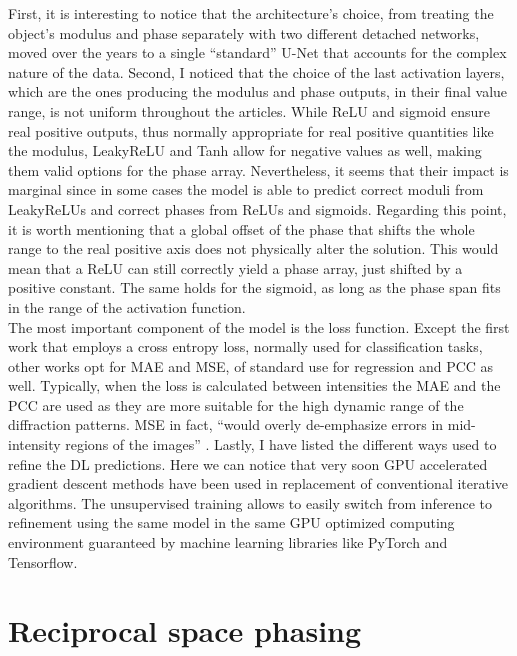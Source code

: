 First, it is interesting to notice that the architecture's choice, from treating the object's modulus and phase separately 
with two different detached networks, moved over the years to a single ``standard'' U-Net that accounts for the complex 
nature of the data. Second, I noticed that the choice of the last activation layers, which are the ones producing the 
modulus and phase outputs, in their final value range, is not uniform throughout the articles. While ReLU and sigmoid
ensure real positive outputs, thus normally appropriate for real positive quantities like the modulus, LeakyReLU and Tanh  
allow for negative values as well, making them valid options for the phase array. Nevertheless, it seems that their impact is marginal 
since in some cases the model is able to predict correct moduli from LeakyReLUs and correct phases from ReLUs and sigmoids. 
Regarding this point, it is worth mentioning that a global offset of the phase that shifts the whole range to the real positive 
axis does not physically alter the solution. This would mean that a ReLU can still correctly yield a phase array, just shifted 
by a positive constant. The same holds for the sigmoid, as long as the phase span fits in the range of the activation function. 
\\
The most important component of the model is the loss function. Except the first work that employs a cross entropy loss, normally 
used for classification tasks, other works opt for MAE and MSE, of standard use for regression and PCC as well. Typically, 
when the loss is calculated between intensities the MAE and the PCC are used as they are more suitable for the high dynamic 
range of the diffraction patterns. MSE in fact, ``would overly de-emphasize errors in mid-intensity regions of the images''
\cite{chan_rapid_2021}.
Lastly, I have listed the different ways used to refine the DL predictions. Here we can notice that very soon GPU accelerated
gradient descent methods have been used in replacement of conventional iterative algorithms. The unsupervised training
allows to easily switch from inference to refinement using the same model in the same GPU optimized 
computing environment guaranteed by machine learning libraries like PyTorch and Tensorflow. 

\section{Reciprocal space phasing}\label{chp:phasing}

